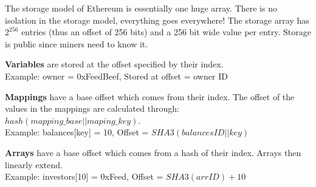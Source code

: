 \documentclass[11pt,oneside,a4paper]{article}
\begin{document}
The storage model of Ethereum is essentially one huge array. There is no isolation in the storage model, everything goes everywhere! The storage array has $2^{256}$ entries (thus an offset of 256 bits) and a 256 bit wide value per entry. Storage is public since miners need to know it.

\begin{compactitem}
	\item \textbf{Variables} are stored at the offset specified by their index.\\
	Example: owner = 0xFeedBeef, Stored at offset = owner ID
	\item \textbf{Mappings} have a base offset which comes from their index. The offset of the values in the mappings are calculated through: $hash(mapping\_base || maping\_key)$.\\
	Example: balances[key] = 10, Offset = $SHA3(balances ID || key)$
	\item \textbf{Arrays} have a base offset which comes from a hash of their index. Arrays then linearly extend.\\
	Example: investors[10] = 0xFeed, Offset = $SHA3(arr ID) + 10$
\end{compactitem}
\end{document}
